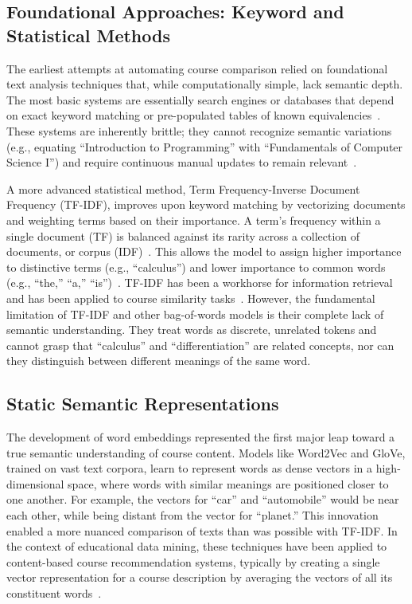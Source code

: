 \begin{introduction}
\subsection{Foundational Approaches: Keyword and Statistical Methods}
The earliest attempts at automating course comparison relied on foundational text analysis techniques that, while computationally simple, lack semantic depth. The most basic systems are essentially search engines or databases that depend on exact keyword matching or pre-populated tables of known equivalencies~\cite{shamrock}. These systems are inherently brittle; they cannot recognize semantic variations (e.g., equating ``Introduction to Programming'' with ``Fundamentals of Computer Science I'') and require continuous manual updates to remain relevant~\cite{shiferaw2024}.

A more advanced statistical method, Term Frequency-Inverse Document Frequency (TF-IDF), improves upon keyword matching by vectorizing documents and weighting terms based on their importance. A term's frequency within a single document (TF) is balanced against its rarity across a collection of documents, or corpus (IDF)~\cite{AIZAWA200345}. This allows the model to assign higher importance to distinctive terms (e.g., ``calculus'') and lower importance to common words (e.g., ``the,'' ``a,'' ``is'')~\cite{AIZAWA200345}. TF-IDF has been a workhorse for information retrieval and has been applied to course similarity tasks~\cite{AIZAWA200345}. However, the fundamental limitation of TF-IDF and other bag-of-words models is their complete lack of semantic understanding. They treat words as discrete, unrelated tokens and cannot grasp that ``calculus'' and ``differentiation'' are related concepts, nor can they distinguish between different meanings of the same word.

\subsection{Static Semantic Representations}
The development of word embeddings represented the first major leap toward a true semantic understanding of course content. Models like Word2Vec and GloVe, trained on vast text corpora, learn to represent words as dense vectors in a high-dimensional space, where words with similar meanings are positioned closer to one another. For example, the vectors for ``car'' and ``automobile'' would be near each other, while being distant from the vector for ``planet.'' This innovation enabled a more nuanced comparison of texts than was possible with TF-IDF. In the context of educational data mining, these techniques have been applied to content-based course recommendation systems, typically by creating a single vector representation for a course description by averaging the vectors of all its constituent words~\cite{pardos10.1145/3330430.3333622}.  


\end{introduction}
